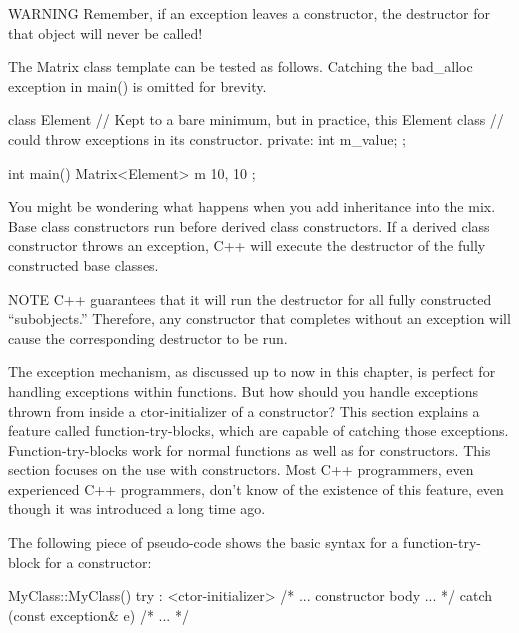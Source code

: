 \begin{myWarning}{WARNING}
Remember, if an exception leaves a constructor, the destructor for that object will never be called!
\end{myWarning}

The Matrix class template can be tested as follows. Catching the bad\_alloc exception in main() is omitted for brevity.

\begin{cpp}
class Element
{
    // Kept to a bare minimum, but in practice, this Element class
    // could throw exceptions in its constructor.
    private:
    int m_value;
};

int main()
{
    Matrix<Element> m { 10, 10 };
}
\end{cpp}

You might be wondering what happens when you add inheritance into the mix. Base class constructors run before derived class constructors. If a derived class constructor throws an exception, C++ will execute the destructor of the fully constructed base classes.

\begin{myNotic}{NOTE}
C++ guarantees that it will run the destructor for all fully constructed “subobjects.” Therefore, any constructor that completes without an exception will cause the corresponding destructor to be run.
\end{myNotic}


The exception mechanism, as discussed up to now in this chapter, is perfect for handling exceptions within functions. But how should you handle exceptions thrown from inside a ctor-initializer of a constructor? This section explains a feature called function-try-blocks, which are capable of catching those exceptions. Function-try-blocks work for normal functions as well as for constructors. This section focuses on the use with constructors. Most C++ programmers, even experienced C++ programmers, don’t know of the existence of this feature, even though it was introduced a long time ago.

The following piece of pseudo-code shows the basic syntax for a function-try-block for a constructor:

\begin{cpp}
MyClass::MyClass()
try
: <ctor-initializer>
{
    /* ... constructor body ... */
}
catch (const exception& e)
{
    /* ... */
}
\end{cpp}

